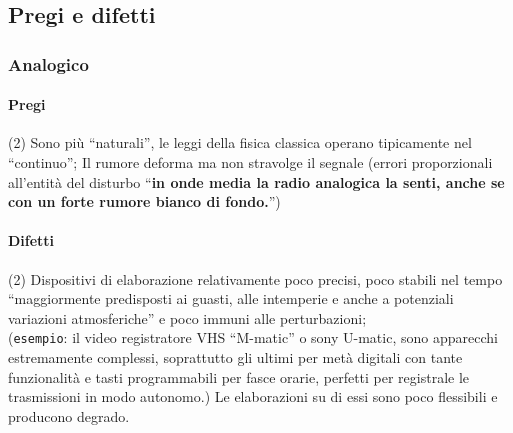 \subsection{Pregi e difetti}
\label{sec:pregiedifettideisegnali}

\subsubsection{Analogico}
\label{sec:analdifpreg}
\paragraph{Pregi}

\begin{tasks}(2)
	\task Sono più ``naturali'', le leggi della fisica classica operano
	tipicamente nel ``continuo'';
	\task Il rumore deforma ma non stravolge il segnale (errori proporzionali
	all'entità del disturbo ``{\bf in onde media la radio analogica la senti,
	anche se con un forte rumore bianco di fondo.}'')
\end{tasks}
\paragraph{Difetti}
\begin{tasks}(2)
	\task Dispositivi di elaborazione relativamente poco precisi, poco stabili
	nel tempo ``maggiormente predisposti ai guasti, alle intemperie e anche a
	potenziali variazioni atmosferiche'' e poco immuni alle perturbazioni;\\
	({\tt esempio}: il video registratore VHS ``M-matic'' o sony U-matic, sono
	apparecchi estremamente complessi, soprattutto gli ultimi per metà digitali
	con tante funzionalità e tasti programmabili per fasce orarie, perfetti per
	registrale le trasmissioni in modo autonomo.)
	\task Le elaborazioni su di essi sono poco flessibili e producono degrado.
\end{tasks}
\clearpage

